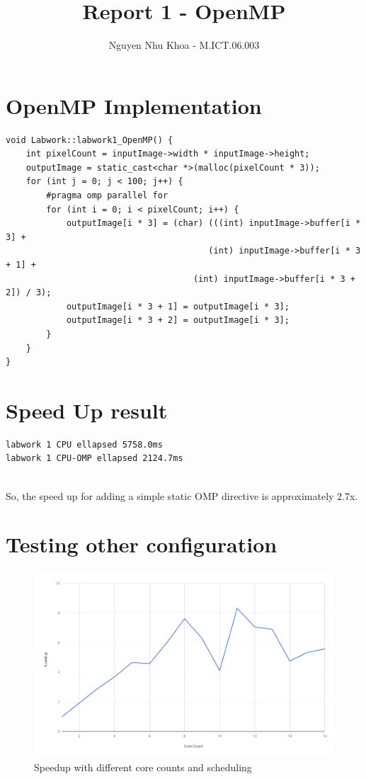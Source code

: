 \documentclass[a4paper,11pt, notitlepage]{article}
\begin{document}
\title{
\vspace{-3cm}
Report 1 - OpenMP}
\author{Nguyen Nhu Khoa - M.ICT.06.003}
\maketitle

\pagestyle{plain}
\setcounter{page}{1}

\vspace{-1cm}
\noindent

\section{OpenMP Implementation}

\begin{verbatim}
void Labwork::labwork1_OpenMP() {
    int pixelCount = inputImage->width * inputImage->height;
    outputImage = static_cast<char *>(malloc(pixelCount * 3));
    for (int j = 0; j < 100; j++) {   
        #pragma omp parallel for
        for (int i = 0; i < pixelCount; i++) {
            outputImage[i * 3] = (char) (((int) inputImage->buffer[i * 3] + 
            							(int) inputImage->buffer[i * 3 + 1] +
                                     (int) inputImage->buffer[i * 3 + 2]) / 3);
            outputImage[i * 3 + 1] = outputImage[i * 3];
            outputImage[i * 3 + 2] = outputImage[i * 3];
        }
    }
}
\end{verbatim}

\section{Speed Up result}
\begin{verbatim}
labwork 1 CPU ellapsed 5758.0ms
labwork 1 CPU-OMP ellapsed 2124.7ms
\end{verbatim}
~\\
So, the speed up for adding a simple static OMP directive is approximately 2.7x.

\section{Testing other configuration}

\begin{figure}[H]
\includegraphics[width=15cm]{chart.png}
\centering
\caption{Speedup with different core counts and scheduling}
\end{figure}
\end{document}
